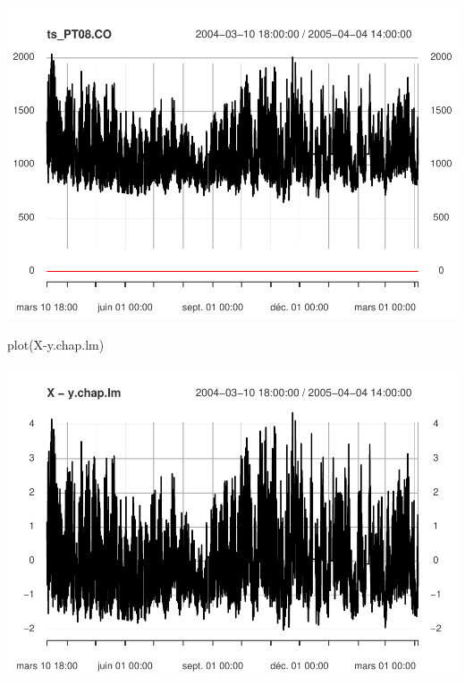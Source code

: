 \documentclass[
]{article}
\newenvironment{Shaded}{\begin{snugshade}}{\end{snugshade}}
\newcommand{\FunctionTok}[1]{\textcolor[rgb]{0.00,0.00,0.00}{#1}}
\newcommand{\NormalTok}[1]{#1}
\newcommand{\SpecialCharTok}[1]{\textcolor[rgb]{0.00,0.00,0.00}{#1}}
\begin{document}
\includegraphics{STA202_report_files/figure-latex/unnamed-chunk-11-4.pdf}

\begin{Shaded}
\begin{Highlighting}[]
\FunctionTok{plot}\NormalTok{(X}\SpecialCharTok{{-}}\NormalTok{y.chap.lm)  }
\end{Highlighting}
\end{Shaded}

\includegraphics{STA202_report_files/figure-latex/unnamed-chunk-11-5.pdf}
\end{document}
